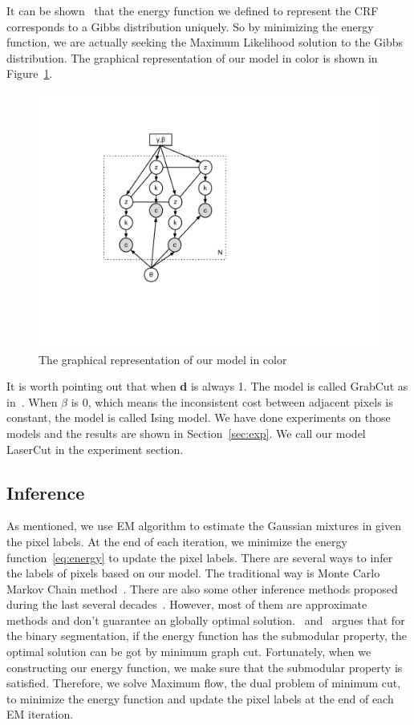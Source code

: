 \documentclass{article} %
\begin{document}
It can be shown~\citep{Geman1984Stochastic, Li2001Markov} that the
energy function we defined to represent the CRF corresponds to a
Gibbs distribution uniquely. So by minimizing the energy function, we
are actually seeking the Maximum Likelihood solution to the Gibbs
distribution. The graphical representation of our model in color is
shown in Figure~\ref{fig:mrf_model}.

\begin{figure}[h]
\begin{center}
\includegraphics[height=0.5\linewidth]{./fig/mrf_model.pdf}
\end{center}
\caption{The graphical representation of our model in color}
\label{fig:mrf_model}
\end{figure}

It is worth pointing out that when \textbf{d} is always 1. The model is
called GrabCut as in~\citep{Rother2004GrabCut}. When $\beta$ is 0,
which means the inconsistent cost between adjacent pixels is constant,
the model is called Ising model. We have done experiments on those
models and the results are shown in Section~\ref{sec:exp}. We call our
model LaserCut in the experiment section.

\subsection{Inference}
As mentioned, we use EM algorithm to estimate the Gaussian mixtures in
given the pixel labels. At the end of each iteration, we minimize the
energy function~\eqref{eq:energy} to update the pixel labels. There
are several ways to infer the labels of pixels based on our model. The
traditional way is Monte Carlo Markov Chain
method~\citep{Bishop2006Pattern}. There are also some other inference
methods proposed during the last several
decades~\citep{Szeliski2008Comparative}. However, most of them are
approximate methods and don't guarantee an globally optimal
solution.~\citet{Boykov2001Fast} and~\citet{Boykov2006} argues that for the binary
segmentation, if the energy function has the submodular property, the
optimal solution can be got by minimum graph cut. Fortunately, when we
constructing our energy function, we make sure that the submodular
property is satisfied. Therefore, we solve Maximum flow, the dual
problem of minimum cut, to minimize the energy function and update the
pixel labels at the end of each EM iteration.
\end{document}
